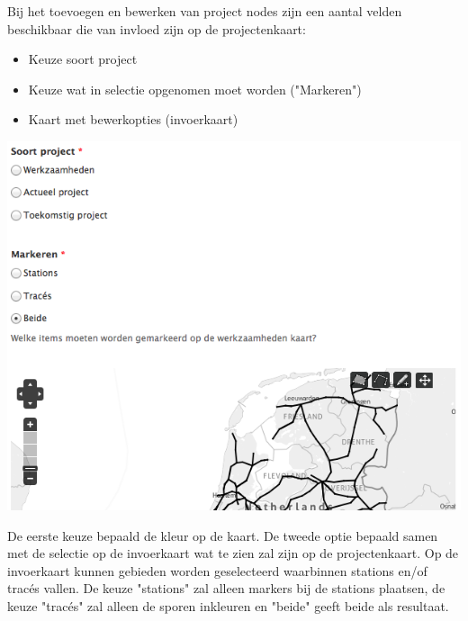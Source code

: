 Bij het toevoegen en bewerken van project nodes zijn een aantal velden beschikbaar die van invloed zijn op de projectenkaart:
\begin{itemize}
\item Keuze soort project
\item Keuze wat in selectie opgenomen moet worden ("Markeren")
\item Kaart met bewerkopties (invoerkaart)
\end{itemize}
\begin{center}
\includegraphics[scale=.5]{img/kaart1.png}
\end{center}
De eerste keuze bepaald de kleur op de kaart. De tweede optie bepaald samen met de selectie op de invoerkaart wat te zien zal zijn op de projectenkaart. Op de invoerkaart kunnen gebieden worden geselecteerd waarbinnen stations en/of trac\'{e}s vallen. De keuze "stations" zal alleen markers bij de stations plaatsen, de keuze "trac\'{e}s" zal alleen de sporen inkleuren en "beide" geeft beide als resultaat.


